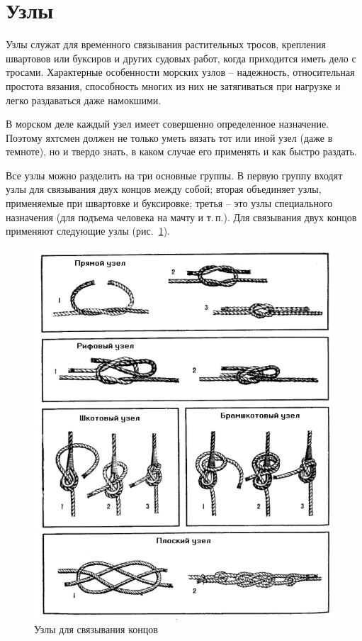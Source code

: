 \documentclass[a4paper, 12pt, twoside, final]{scrbook}
\begin{document}
\section{Узлы}

Узлы служат для временного связывания растительных тросов, крепления швартовов или буксиров и других судовых работ, когда приходится иметь дело с тросами. Характерные особенности морских узлов \--- надежность, относительная простота вязания, способность многих из них не затягиваться при нагрузке и легко раздаваться даже намокшими.

В морском деле каждый узел имеет совершенно определенное назначение. Поэтому яхтсмен должен не только уметь вязать тот или иной узел (даже в темноте), но и твердо знать, в каком случае его применять и как быстро раздать.

Все узлы можно разделить на три основные группы. В первую группу входят узлы для связывания двух концов между собой; вторая объединяет узлы, применяемые при швартовке и буксировке; третья \--- это узлы специального назначения (для подъема человека на мачту и т.\,п.). Для связывания двух концов применяют следующие узлы (рис.~\ref{fig:59}).

\begin{figure}[htbp]
   \centering
   \includegraphics{pics/59_Uzly} %
   \caption{Узлы для связывания концов}
   \label{fig:59}
\end{figure}
\end{document}
